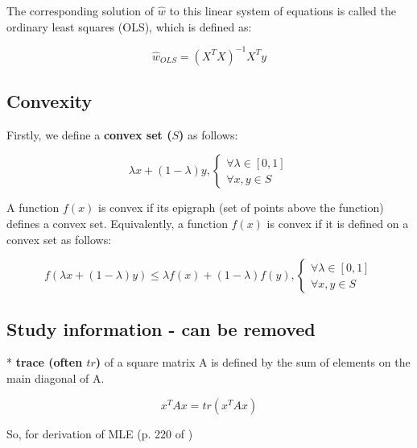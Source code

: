 \documentclass{article}
\begin{document}
The corresponding solution of $\hat{w}$ to this linear system of equations is called the ordinary least squares (OLS), which is defined as:

\begin{equation}
  \hat{w}_{OLS} = (X^{T}X)^{-1}X^{T}y
\end{equation}

\subsection{Convexity}

Firstly, we define a \textbf{convex set ($S$)} as follows:

\begin{equation}
\lambda x + (1 - \lambda) y,
\begin{cases} 
  \text{$\forall \lambda \in [0,1]$} \\ 
  \text{$\forall x, y \in S$} 
\end{cases}
\end{equation}

A function $f(x)$ is convex if its epigraph (set of points above the function) defines a convex set. Equivalently, a function $f(x)$ is convex if it is defined on a convex set as follows:

\begin{equation}
f(\lambda x + (1 - \lambda) y) \leq \lambda f(x) + (1 - \lambda) f(y), 
\begin{cases} 
  \text{$\forall \lambda \in [0,1]$} \\ 
  \text{$\forall x, y \in S$} 
\end{cases}
\end{equation}


\subsection{Study information - can be removed}
* \textbf{trace (often $tr$)} of a square matrix A is defined by the sum of elements on the main diagonal of A.

\begin{equation}
  x^{T}Ax = tr(x^{T}Ax)
\end{equation}

So, for derivation of MLE (p. 220 of \cite{murphy2012})


\printbibliography
\end{document}
